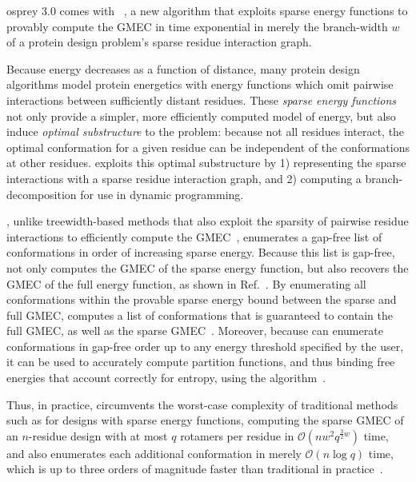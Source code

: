 \def\Oh{$\mathcal{O}$}

{\sc osprey} 3.0 comes with {\bwmstar}~\cite{BWM*}, a new algorithm that exploits sparse energy functions to provably compute the GMEC in time exponential in merely the branch-width $w$ of a protein design problem's sparse residue interaction graph.

Because energy decreases as a function of distance, many protein design algorithms model protein energetics with energy functions which omit pairwise interactions between sufficiently distant residues. These \emph{sparse energy functions} not only provide a simpler, more efficiently computed model of energy, but also induce \emph{optimal substructure} to the problem: because not all residues interact, the optimal conformation for a given residue can be independent of the conformations at other residues. {\bwmstar} exploits this optimal substructure by 1) representing the sparse interactions with a sparse residue interaction graph, and 2) computing a branch-decomposition for use in dynamic programming. 

{\bwmstar}, unlike treewidth-based methods that also exploit the sparsity of pairwise residue interactions to efficiently compute the GMEC~\cite{treewidth}, enumerates a gap-free list of conformations in order of increasing sparse energy. Because this list is gap-free, {\bwmstar} not only computes the GMEC of the sparse energy function, but also recovers the GMEC of the full energy function, as shown in Ref.~. By enumerating all conformations within the provable sparse energy bound between the sparse and full GMEC, {\bwmstar} computes a list of conformations that is guaranteed to contain the full GMEC, as well as the sparse GMEC~\cite{sprig_analysis}.  Moreover, because {\bwmstar} can enumerate conformations in gap-free order up to any energy threshold specified by the user, it can be used to accurately compute partition functions, and thus binding free energies that account correctly for entropy, using the \ks algorithm~\cite{K*,minDEE}.  

Thus, in practice, {\bwmstar} circumvents the worst-case complexity of traditional methods such as \as for designs with sparse energy functions, computing the sparse GMEC of an $n$-residue design with at most $q$ rotamers per residue in \Oh$(nw^2q^{\frac{3}{2}w})$ time, and also enumerates each additional conformation in merely \Oh$(n\log q)$ time, which is up to three orders of magnitude faster than traditional \as in practice~\cite{BWM*}.